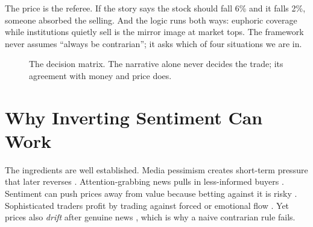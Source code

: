 \documentclass[11pt,a4paper]{article}
\begin{document}
The price is the referee. If the story says the stock should fall 6\% and it falls 2\%, someone absorbed the selling. And the logic runs both ways: euphoric coverage while institutions quietly sell is the mirror image at market tops. The framework never assumes ``always be contrarian''; it asks which of four situations we are in.

\begin{figure}[ht]
\centering
{}
\caption{The decision matrix. The narrative alone never decides the trade; its agreement with money and price does.}
\label{fig:matrix}
\end{figure}

\section{Why Inverting Sentiment Can Work}

The ingredients are well established. Media pessimism creates short-term pressure that later reverses \citep{tetlock2007}. Attention-grabbing news pulls in less-informed buyers \citep{barber2008}. Sentiment can push prices away from value because betting against it is risky \citep{delong1990,shleifer1997}. Sophisticated traders profit by trading against forced or emotional flow \citep{brunnermeier2005}. Yet prices also \emph{drift} after genuine news \citep{chan2003}, which is why a naive contrarian rule fails.
\end{document}
